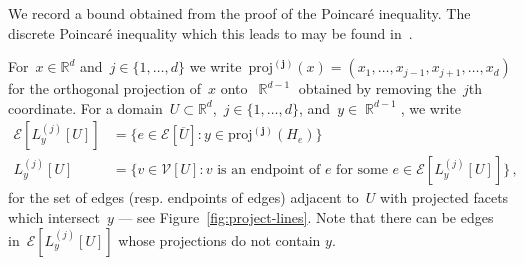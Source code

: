 \documentclass[12pt]{amsart}
\numberwithin{equation}{section}
\DeclareMathOperator{\R}{\mathbb{R}}
\newcommand*{\Rd}{\ensuremath{\mathbb{R}^d}}
\newcommand{\V}{\mathcal{V}}
\newcommand{\E}{\mathcal{E}}
\newcommand{\projj}{\boldsymbol{\mathrm{proj}^{(j)}}}
\newcommand{\Lyj}{\hyperref[eq:line-project]{L_y^{(j)}}}
\begin{document}
We record a bound obtained from the proof of the Poincar\'e inequality. The discrete Poincar\'e inequality which this leads
to may be found in~\cite[Lemma 9.1]{eymard2000finite}. 


For~$x \in \Rd$ and~$j \in \{1, \ldots, d\}$ we write~$\projj(x)  = (x_1, \ldots, x_{j-1}, x_{j+1}, \ldots, x_d)$ for the orthogonal projection of~$x$ onto~$\R^{d-1}$ obtained by removing the~$j$th coordinate. For a domain~$U \subset \Rd$,~$j \in \{1, \ldots, d\}$, and~$y \in \R^{d-1}$, we write
\begin{equation}
	\begin{aligned}
	\label{eq:line-project}
	\E[\Lyj[U]] &= \{ e \in \E[\overline{U}] : y \in \projj(H_e) \} \\
	\Lyj[U] &= \{v \in \V[U]: v \mbox{ is an endpoint of~$e$ for some~$e \in \E[\Lyj[U]]$} \} \, ,
	\end{aligned} 
\end{equation}
for the set of edges (resp. endpoints of edges) adjacent to~$U$ with projected facets which intersect~$y$ --- see Figure~\ref{fig:project-lines}. 
Note that there can be edges in~$\E[\Lyj[U]]$ whose projections do not contain $y$.
\end{document}
